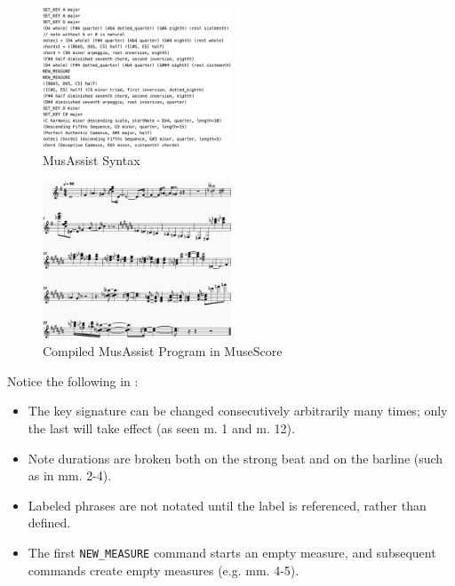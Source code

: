 \documentclass{article}
\begin{document}
\begin{figure}[h!]
\centering
\includegraphics[width=0.5\textwidth]{images/example_program_code}
\vspace{-4mm}
\caption{MusAssist Syntax}\label{fig:example_program_code}
\end{figure}
\vspace{-6mm}
\begin{figure}[h!]
\centering
\includegraphics[width=0.5\textwidth]{images/example_program}
\caption{Compiled MusAssist Program in MuseScore}\label{fig:example_program}
\vspace{-4mm}
\end{figure}
  
Notice the following in :
\vspace{-3mm}
\begin{itemize}
\item The key signature can be changed consecutively arbitrarily many times; only the last will take effect (as seen m. 1 and m. 12).
\item Note durations are broken both on the strong beat and on the barline (such as in mm. 2-4). 
\item Labeled phrases are not notated until the label is referenced, rather than defined.
\item The first \verb.NEW_MEASURE. command starts an empty measure, and subsequent commands create empty measures (e.g. mm. 4-5).
\end{itemize}
\end{document}
